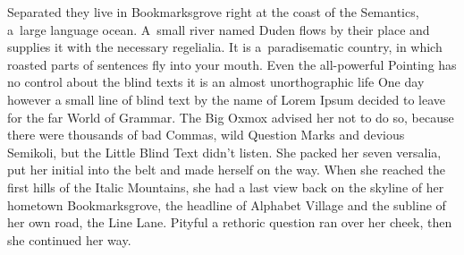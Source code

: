 Separated they live in Bookmarksgrove right at the coast of the Semantics, a~large language ocean. A~small river named Duden flows by their place and supplies it with the necessary regelialia. It is a~paradisematic country, in which roasted parts of sentences fly into your mouth. Even the all-powerful Pointing has no control about the blind texts it is an almost unorthographic life One day however a small line of blind text by the name of Lorem Ipsum decided to leave for the far World of Grammar. The Big Oxmox advised her not to do so, because there were thousands of bad Commas, wild Question Marks and devious Semikoli, but the Little Blind Text didn't listen. She packed her seven versalia, put her initial into the belt and made herself on the way. When she reached the first hills of the Italic Mountains, she had a last view back on the skyline of her hometown Bookmarksgrove, the headline of Alphabet Village and the subline of her own road, the Line Lane. Pityful a rethoric question ran over her cheek, then she continued her way.%

